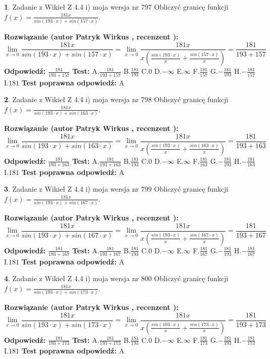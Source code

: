 \documentclass[12pt, a4paper]{article}
\theoremstyle{definition} %
\newtheorem{zad}{}
\newcommand{\zadStart}[1]{\begin{zad}#1\newline}
\newcommand{\zadStop}{\end{zad}}
\newcommand{\rozwStart}[2]{\noindent \textbf{Rozwiązanie (autor #1 , recenzent #2): }\newline}
\newcommand{\rozwStop}{\newline}
\newcommand{\odpStart}{\noindent \textbf{Odpowiedź:}\newline}
\newcommand{\odpStop}{\newline}
\newcommand{\testStart}{\noindent \textbf{Test:}\newline}
\newcommand{\testStop}{\newline}
\newcommand{\kluczStart}{\noindent \textbf{Test poprawna odpowiedź:}\newline}
\newcommand{\kluczStop}{\newline}
\begin{document}
\zadStart{Zadanie z Wikieł Z 4.4 i) moja wersja nr 797}
Obliczyć granicę funkcji $f(x)=\frac{181x}{sin(193\cdot x) +sin(157\cdot x)}$.
\zadStop
\rozwStart{Patryk Wirkus}{}
$$\lim\limits_{x\to 0}\frac{181x}{sin(193\cdot x) +sin(157\cdot x)}=\lim\limits_{x\to 0}\frac{181x}{x(\frac{sin(193\cdot x)}{x}+\frac{sin(157\cdot x)}{x})}=\frac{181}{193+157}$$
\rozwStop
\odpStart
$\frac{181}{193+157}$
\odpStop
\testStart
A.$\frac{181}{193+157}$
B.$\frac{181}{193}$
C.$0$
D.$-\infty$
E.$\infty$
F.$\frac{181}{157}$
G.$-\frac{181}{193}$
H.$-\frac{181}{157}$
I.$181$
\testStop
\kluczStart
A
\kluczStop



\zadStart{Zadanie z Wikieł Z 4.4 i) moja wersja nr 798}
Obliczyć granicę funkcji $f(x)=\frac{181x}{sin(193\cdot x) +sin(163\cdot x)}$.
\zadStop
\rozwStart{Patryk Wirkus}{}
$$\lim\limits_{x\to 0}\frac{181x}{sin(193\cdot x) +sin(163\cdot x)}=\lim\limits_{x\to 0}\frac{181x}{x(\frac{sin(193\cdot x)}{x}+\frac{sin(163\cdot x)}{x})}=\frac{181}{193+163}$$
\rozwStop
\odpStart
$\frac{181}{193+163}$
\odpStop
\testStart
A.$\frac{181}{193+163}$
B.$\frac{181}{193}$
C.$0$
D.$-\infty$
E.$\infty$
F.$\frac{181}{163}$
G.$-\frac{181}{193}$
H.$-\frac{181}{163}$
I.$181$
\testStop
\kluczStart
A
\kluczStop



\zadStart{Zadanie z Wikieł Z 4.4 i) moja wersja nr 799}
Obliczyć granicę funkcji $f(x)=\frac{181x}{sin(193\cdot x) +sin(167\cdot x)}$.
\zadStop
\rozwStart{Patryk Wirkus}{}
$$\lim\limits_{x\to 0}\frac{181x}{sin(193\cdot x) +sin(167\cdot x)}=\lim\limits_{x\to 0}\frac{181x}{x(\frac{sin(193\cdot x)}{x}+\frac{sin(167\cdot x)}{x})}=\frac{181}{193+167}$$
\rozwStop
\odpStart
$\frac{181}{193+167}$
\odpStop
\testStart
A.$\frac{181}{193+167}$
B.$\frac{181}{193}$
C.$0$
D.$-\infty$
E.$\infty$
F.$\frac{181}{167}$
G.$-\frac{181}{193}$
H.$-\frac{181}{167}$
I.$181$
\testStop
\kluczStart
A
\kluczStop



\zadStart{Zadanie z Wikieł Z 4.4 i) moja wersja nr 800}
Obliczyć granicę funkcji $f(x)=\frac{181x}{sin(193\cdot x) +sin(173\cdot x)}$.
\zadStop
\rozwStart{Patryk Wirkus}{}
$$\lim\limits_{x\to 0}\frac{181x}{sin(193\cdot x) +sin(173\cdot x)}=\lim\limits_{x\to 0}\frac{181x}{x(\frac{sin(193\cdot x)}{x}+\frac{sin(173\cdot x)}{x})}=\frac{181}{193+173}$$
\rozwStop
\odpStart
$\frac{181}{193+173}$
\odpStop
\testStart
A.$\frac{181}{193+173}$
B.$\frac{181}{193}$
C.$0$
D.$-\infty$
E.$\infty$
F.$\frac{181}{173}$
G.$-\frac{181}{193}$
H.$-\frac{181}{173}$
I.$181$
\testStop
\kluczStart
A
\kluczStop
\end{document}
